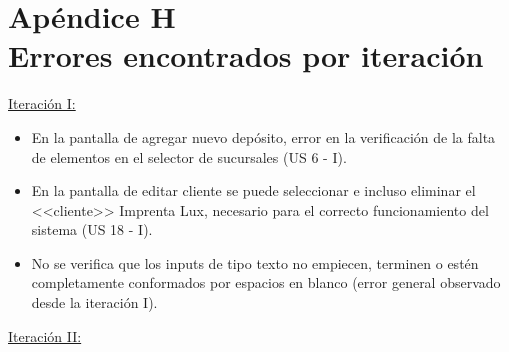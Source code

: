 \documentclass[a4paper, 12pt,twoside]{report}  %
\numberwithin{equation}{subsection} %
\begin{document}
\chapter*{\hypertarget{apendice_h}{}Apéndice H\\Errores encontrados por iteración}

\noindent\underline{Iteración I:}
\begin{itemize}
	\item En la pantalla de agregar nuevo depósito, error en la verificación de la falta de elementos en el selector de sucursales (US 6 - I).
	\item En la pantalla de editar cliente se puede seleccionar e incluso eliminar el <<cliente>> Imprenta Lux, necesario para el correcto funcionamiento del sistema (US 18 - I).
	\item No se verifica que los inputs de tipo texto no empiecen, terminen o estén completamente conformados por espacios en blanco (error general observado desde la iteración I).
\end{itemize}
\underline{Iteración II:}
\end{document}
